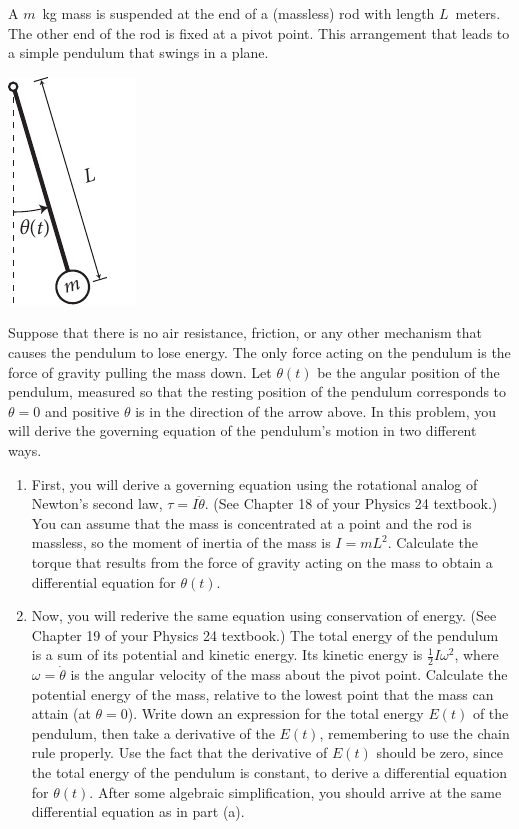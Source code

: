 \documentclass[12pt,letterpaper]{hmcpset}
\begin{document}
\begin{problem}[2]
    A $m$~kg mass is suspended at the end of a (massless) rod with length $L$~meters. The other end of the rod is fixed at a pivot point. This arrangement that leads to a simple pendulum that swings in a plane.
    \begin{center}
        \includegraphics[width=.75in,keepaspectratio=true]{img/apr_26_2_pendulum.pdf}
    \end{center}

    \vspace{-.2in}Suppose that there is no air resistance, friction, or any other mechanism that causes the pendulum to lose energy. The only force acting on the pendulum is the force of gravity pulling the mass down.  Let $\theta(t)$ be the angular position of the pendulum, measured so that the resting position of the pendulum corresponds to $\theta=0$ and positive $\theta$ is in the direction of the arrow above. In this problem, you will derive the governing equation of the pendulum's motion in two different ways.
    \begin{enumerate}
        \item First, you will derive a governing equation using the rotational analog of Newton's second law, $\tau=I\ddot{\theta}$.  (See Chapter 18 of your Physics 24 textbook.) You can assume that the mass is concentrated at a point and the rod is massless, so the moment of inertia of the mass is $I=mL^2$.  Calculate the torque that results from the force of gravity acting on the mass to obtain a differential equation for $\theta(t)$.
        \item Now, you will rederive the same equation using conservation of energy.  (See Chapter 19 of your Physics 24 textbook.)  The total energy of the pendulum is a sum of its potential and kinetic energy.  Its kinetic energy is $\tfrac{1}{2}I\omega^2$, where $\omega=\dot{\theta}$ is the angular velocity of the mass about the pivot point.  Calculate the potential energy of the mass, relative to the lowest point that the mass can attain (at $\theta=0$).  Write down an expression for the total energy $E(t)$ of the pendulum, then take a derivative of the $E(t)$, remembering to use the chain rule properly. Use the fact that the derivative of $E(t)$ should be zero, since the total energy of the pendulum is constant, to derive a differential equation for $\theta(t)$.  After some algebraic simplification, you should arrive at the same differential equation as in part (a).
    \end{enumerate}
\end{problem}
\newpage
\end{document}
